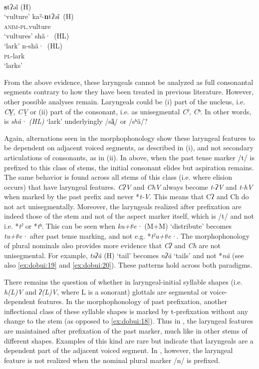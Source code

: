 \documentclass[output=paper]{langscibook}
\begin{document}
\ea\label{ex:dobui:20}
{ \label{bkm:Ref111916220}\citet{JP2021}}\\
\ea
  \textbf{s}tʔəĩ (H) \\
\glt ‘vulture’
\ex
\gll ka²-\textbf{n}tʔəĩ~(H)\\
     \textsc{anim}-\textsc{pl}.vulture\\
\glt ‘vultures’
\ex
  shã·~(HL)\\
\glt ‘lark’
\ex
\gll n-shã·~(HL)\\
     \textsc{pl}-lark\\
\glt ‘larks’
\z
\z

From the above evidence, these laryngeals cannot be analyzed as full consonantal segments contrary to how they have been treated in previous literature. However, other possible analyses remain. Laryngeals could be (i) part of the nucleus, i.e. \textit{CV̤}, \textit{CV̰ } or (ii) part of the consonant, i.e. as unisegmental \textit{Cˀ}, \textit{Cʰ}. In other words, is \textit{shã· (HL)} ‘lark’ underlyingly /sã̤/ or /sʰã/? 

Again, alternations seen in the morphophonology show these laryngeal features to be dependent on adjacent voiced segments, as described in (i), and not secondary articulations of consonants, as in (ii). In  above, when the past tense marker /t/ is prefixed to this class of stems, the initial consonant elides but aspiration remains. The same behavior is found across all stems of this class (i.e. where elision occurs) that have laryngeal features. \textit{CʔV} and \textit{ChV} always become \textit{t-ʔV} and \textit{t-hV} when marked by the past prefix and never *\textit{t-V}. This means that Cʔ and Ch do not act unisegmentally. Moreover, the laryngeals realized after prefixation are indeed those of the stem and not of the aspect marker itself, which is /t/ and not i.e. *\textit{tˀ} or *\textit{tʰ}. This can be seen when \textit{ku+tʲe·} (M+M) ‘distribute’ becomes \textit{tu+tʲe·} after past tense marking, and not e.g. *\textit{tˀu+tʲe·}. The morphophonology of plural nominals also provides more evidence that \textit{Cʔ} and \textit{Ch} are not unisegmental. For example, \textit{tsʔã} (H) ‘tail’ becomes \textit{nʔã} ‘tails’ and not *\textit{nã} (see also \ref{ex:dobui:19} and \ref{ex:dobui:20}). These patterns hold across both paradigms.

There remains the question of whether in laryngeal-initial syllable shapes (i.e. \textit{h(L)V} and \textit{ʔ(L)V}, where L is a sonorant) glottals are segmental or voice-dependent features. In the morphophonology of past prefixation, another inflectional class of these syllable shapes is marked by t-prefixation without any change to the stem (as opposed to \ref{ex:dobui:18}). Thus in , the laryngeal features are maintained after prefixation of the past marker, much like in other stems of different shapes. Examples of this kind are rare but indicate that laryngeals are a dependent part of the adjacent voiced segment. In , however, the laryngeal feature is not realized when the nominal plural marker /n/ is prefixed.
\end{document}
